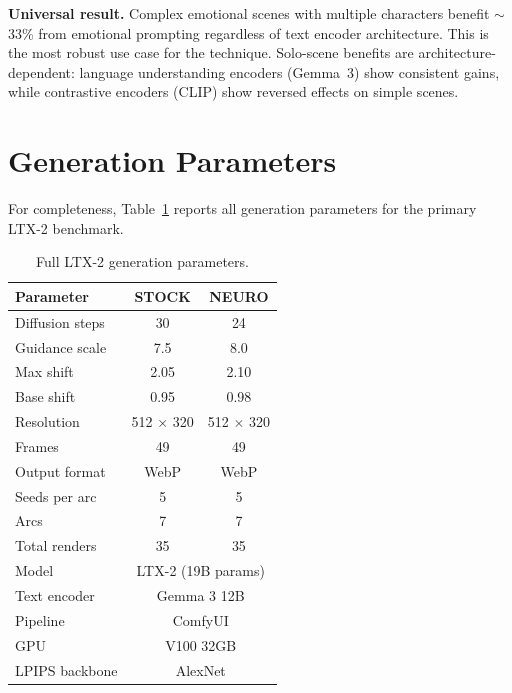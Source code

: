 \documentclass[10pt,twocolumn,letterpaper]{article}
\begin{document}
\textbf{Universal result.} Complex emotional scenes with multiple characters benefit $\sim$33\% from emotional prompting regardless of text encoder architecture. This is the most robust use case for the technique. Solo-scene benefits are architecture-dependent: language understanding encoders (Gemma~3) show consistent gains, while contrastive encoders (CLIP) show reversed effects on simple scenes.

\section{Generation Parameters}
\label{sec:gen_params}

For completeness, Table~\ref{tab:gen_params_full} reports all generation parameters for the primary LTX-2 benchmark.

\begin{table}[h]
\centering
\small
\caption{Full LTX-2 generation parameters.}
\label{tab:gen_params_full}
\begin{tabular}{lcc}
\toprule
\textbf{Parameter} & \textbf{STOCK} & \textbf{NEURO} \\
\midrule
Diffusion steps & 30 & 24 \\
Guidance scale & 7.5 & 8.0 \\
Max shift & 2.05 & 2.10 \\
Base shift & 0.95 & 0.98 \\
Resolution & 512 $\times$ 320 & 512 $\times$ 320 \\
Frames & 49 & 49 \\
Output format & WebP & WebP \\
Seeds per arc & 5 & 5 \\
Arcs & 7 & 7 \\
Total renders & 35 & 35 \\
\midrule
Model & \multicolumn{2}{c}{LTX-2 (19B params)} \\
Text encoder & \multicolumn{2}{c}{Gemma 3 12B} \\
Pipeline & \multicolumn{2}{c}{ComfyUI} \\
GPU & \multicolumn{2}{c}{V100 32GB} \\
LPIPS backbone & \multicolumn{2}{c}{AlexNet} \\
\bottomrule
\end{tabular}
\end{table}
\end{document}

